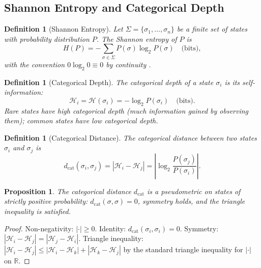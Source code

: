 \documentclass[twocolumn,10pt]{article}
\newtheorem{definition}[theorem]{Definition}
\newtheorem{proposition}[theorem]{Proposition}
\theoremstyle{remark}
\newcommand{\dcat}{d_{\mathrm{cat}}}
\begin{document}
\subsection{Shannon Entropy and Categorical Depth}

\begin{definition}[Shannon Entropy]
\label{def:shannon}
Let $\Sigma = \{\sigma_1, \ldots, \sigma_n\}$ be a finite set of states with probability distribution $P$.  The Shannon entropy of $P$ is
\begin{equation}
    H(P) = -\sum_{\sigma \in \Sigma} P(\sigma) \log_2 P(\sigma) \quad \text{(bits)},
    \label{eq:shannon}
\end{equation}
with the convention $0 \log_2 0 \equiv 0$ by continuity \cite{shannon1948}.
\end{definition}

\begin{definition}[Categorical Depth]
\label{def:cat_depth}
The \emph{categorical depth} of a state $\sigma_i$ is its self-information:
\begin{equation}
    \mathcal{H}_i = \mathcal{H}(\sigma_i) = -\log_2 P(\sigma_i) \quad \text{(bits)}.
    \label{eq:cat_depth}
\end{equation}
Rare states have high categorical depth (much information gained by observing them); common states have low categorical depth.
\end{definition}

\begin{definition}[Categorical Distance]
\label{def:cat_distance}
The \emph{categorical distance} between two states $\sigma_i$ and $\sigma_j$ is
\begin{equation}
    \dcat(\sigma_i, \sigma_j) = |\mathcal{H}_i - \mathcal{H}_j| = \left|\log_2 \frac{P(\sigma_j)}{P(\sigma_i)}\right|.
    \label{eq:cat_distance}
\end{equation}
\end{definition}

\begin{proposition}
\label{prop:cat_metric}
The categorical distance $\dcat$ is a pseudometric on states of strictly positive probability: $\dcat(\sigma, \sigma) = 0$, symmetry holds, and the triangle inequality is satisfied.
\end{proposition}

\begin{proof}
Non-negativity: $|\cdot| \geq 0$.  Identity: $\dcat(\sigma_i, \sigma_i) = 0$.  Symmetry: $|\mathcal{H}_i - \mathcal{H}_j| = |\mathcal{H}_j - \mathcal{H}_i|$.  Triangle inequality: $|\mathcal{H}_i - \mathcal{H}_j| \leq |\mathcal{H}_i - \mathcal{H}_k| + |\mathcal{H}_k - \mathcal{H}_j|$ by the standard triangle inequality for $|\cdot|$ on $\mathbb{R}$.
\end{proof}
\end{document}
